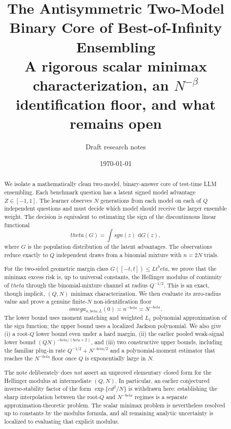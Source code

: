 \documentclass[11pt]{article}
\title{The Antisymmetric Two-Model Binary Core of Best-of-Infinity Ensembling\\
\large A rigorous scalar minimax characterization, an $N^{-\beta}$ identification floor, and what remains open}
\author{Draft research notes}
\date{\today}
\def\beta{beta}%
\def\theta{theta}%
\def\omega{omega}%
\def\sgn{sgn}%
\newcommand{\sgn}{\operatorname{sgn}}
\newcommand{\dd}{\,\mathrm d}
\begin{document}
\maketitle

\begin{abstract}
We isolate a mathematically clean two-model, binary-answer core of test-time LLM ensembling.  Each benchmark question has a latent signed model advantage $Z\in[-1,1]$.  The learner observes $N$ generations from each model on each of $Q$ independent questions and must decide which model should receive the larger ensemble weight.  The decision is equivalent to estimating the sign of the discontinuous linear functional
\[
\theta(G)=\int \sgn(z)\,\dd G(z),
\]
where $G$ is the population distribution of the latent advantages.  The observations reduce exactly to $Q$ independent draws from a binomial mixture with $n=2N$ trials.

For the two-sided geometric margin class $G([-t,t])\le L t^\beta$, we prove that the minimax excess risk is, up to universal constants, the Hellinger modulus of continuity of $\theta$ through the binomial-mixture channel at radius $Q^{-1/2}$.  This is an exact, though implicit, $(Q,N)$ minimax characterization.  We then evaluate its zero-radius value and prove a genuine finite-$N$ non-identification floor
\[
\omega_{n,\beta,L}(0)\asymp n^{-\beta}\asymp N^{-\beta}.
\]
The lower bound uses moment matching and weighted $L_1$ polynomial approximation of the sign function; the upper bound uses a localized Jackson polynomial.  We also give (i) a root-$Q$ lower bound even under a hard margin, (ii) the earlier pooled weak-signal lower bound $(QN)^{-\beta/(\beta+2)}$, and (iii) two constructive upper bounds, including the familiar plug-in rate $Q^{-1/2}+N^{-\beta/2}$ and a polynomial-moment estimator that reaches the $N^{-\beta}$ floor once $Q$ is exponentially large in $N$.

The note deliberately does \emph{not} assert an unproved elementary closed form for the Hellinger modulus at intermediate $(Q,N)$.  In particular, an earlier conjectured inverse-stability factor of the form $\exp\{c d^2/N\}$ is withdrawn here: establishing the sharp interpolation between the root-$Q$ and $N^{-\beta}$ regimes is a separate approximation-theoretic problem.  The scalar minimax problem is nevertheless resolved up to constants by the modulus formula, and all remaining analytic uncertainty is localized to evaluating that explicit modulus.
\end{abstract}
\end{document}
